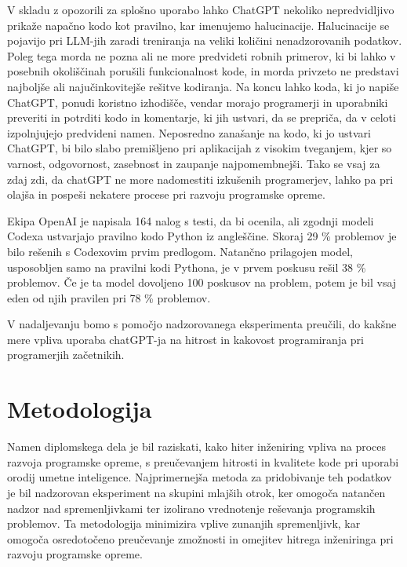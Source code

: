 \documentclass[a4paper,12pt,openright]{book}
\begin{document}
V skladu z opozorili za splošno uporabo lahko ChatGPT nekoliko nepredvidljivo prikaže napačno kodo kot pravilno, kar imenujemo halucinacije. Halucinacije se pojavijo pri LLM-jih zaradi treniranja na veliki količini nenadzorovanih podatkov. \cite{alkaissi2023artificial} \\
Poleg tega morda ne pozna ali ne more predvideti robnih primerov, ki bi lahko v posebnih okoliščinah porušili funkcionalnost kode, in morda privzeto ne predstavi najboljše ali najučinkovitejše rešitve kodiranja. Na koncu lahko koda, ki jo napiše ChatGPT, ponudi koristno izhodišče, vendar morajo programerji in uporabniki preveriti in potrditi kodo in komentarje, ki jih ustvari, da se prepriča, da v celoti izpolnjujejo predvideni namen. Neposredno zanašanje na kodo, ki jo ustvari ChatGPT, bi bilo slabo premišljeno pri aplikacijah z visokim tveganjem, kjer so varnost, odgovornost, zasebnost in zaupanje najpomembnejši. Tako se vsaj za zdaj zdi, da chatGPT ne more nadomestiti izkušenih programerjev, lahko pa pri olajša in pospeši nekatere procese pri razvoju programske opreme.
\cite{Meyer2023}

Ekipa OpenAI je napisala 164 nalog s testi, da bi ocenila, ali
zgodnji modeli Codexa ustvarjajo pravilno kodo Python iz angleščine. Skoraj 29 \% problemov je bilo rešenih s Codexovim prvim predlogom. 
Natančno prilagojen model, usposobljen samo na pravilni kodi Pythona,
je v prvem poskusu rešil 38 \% problemov. Če je ta model
dovoljeno 100 poskusov na problem, potem je bil vsaj eden od njih
pravilen pri 78 \% problemov. \cite{DBLP:journals/corr/abs-2107-03374}

V nadaljevanju bomo s pomočjo nadzorovanega eksperimenta preučili, do kakšne mere vpliva uporaba chatGPT-ja na hitrost in kakovost programiranja pri programerjih začetnikih.


\chapter{Metodologija}

Namen diplomskega dela je bil raziskati, kako hiter inženiring vpliva na proces razvoja programske opreme, s preučevanjem hitrosti in kvalitete kode pri uporabi orodij umetne inteligence. Najprimernejša metoda za pridobivanje teh podatkov je bil nadzorovan eksperiment na skupini mlajših otrok, ker omogoča natančen nadzor nad spremenljivkami ter izolirano vrednotenje reševanja programskih problemov. Ta metodologija minimizira vplive zunanjih spremenljivk, kar omogoča osredotočeno preučevanje zmožnosti in omejitev hitrega inženiringa pri razvoju programske opreme.
\end{document}
